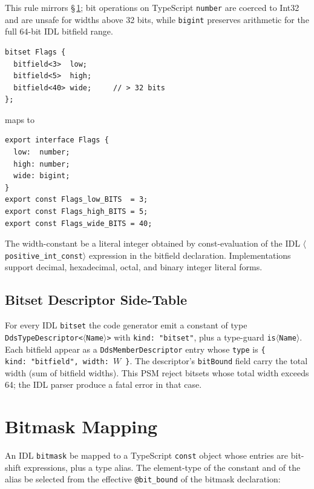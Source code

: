 \documentclass{../styles/zerodds-vendor-spec}
\begin{document}
This rule mirrors \S\,\ref{sec:bitmask-mapping}; bit operations on
TypeScript \texttt{number} are coerced to Int32 and are unsafe for
widths above 32 bits, while \texttt{bigint} preserves
arithmetic for the full 64-bit IDL bitfield range.

\begin{specexample}
\begin{lstlisting}
bitset Flags {
  bitfield<3>  low;
  bitfield<5>  high;
  bitfield<40> wide;     // > 32 bits
};
\end{lstlisting}
maps to
\begin{lstlisting}
export interface Flags {
  low:  number;
  high: number;
  wide: bigint;
}
export const Flags_low_BITS  = 3;
export const Flags_high_BITS = 5;
export const Flags_wide_BITS = 40;
\end{lstlisting}
\end{specexample}

The width-constant  be a literal integer obtained by
const-evaluation of the IDL \texttt{$\langle$positive\_int\_const$\rangle$}
expression in the bitfield declaration. Implementations
 support decimal, hexadecimal, octal, and binary
integer literal forms.

\subsection{Bitset Descriptor Side-Table}\label{sec:bitset-descriptor}

For every IDL \texttt{bitset} the code generator 
emit a constant of type
\texttt{DdsTypeDescriptor<$\langle$Name$\rangle$>} with
\texttt{kind:\,"bitset"}, plus a type-guard
\texttt{is$\langle$Name$\rangle$}. Each bitfield 
appear as a \texttt{DdsMemberDescriptor} entry whose
\texttt{type} is
\texttt{\{ kind:\,"bitfield",\,width:\,$W$ \}}. The descriptor's
\texttt{bitBound} field  carry the total width
(sum of bitfield widths). This PSM  reject bitsets
whose total width exceeds 64; the IDL parser 
produce a fatal error in that case.

\section{Bitmask Mapping}\label{sec:bitmask-mapping}

An IDL \texttt{bitmask}  be mapped to a TypeScript
\texttt{const} object whose entries are bit-shift expressions, plus
a type alias. The element-type of the constant and of the alias
 be selected from the effective \texttt{@bit\_bound}
of the bitmask declaration:
\end{document}
